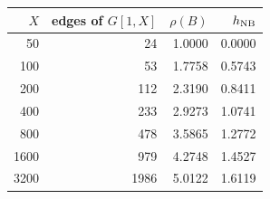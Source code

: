 \begin{tabular}{rrrr}\toprule $X$ & edges of $G[1,X]$ & $\rho(B)$ & $h_{\rm NB}$\\\midrule
50 & 24 & 1.0000 & 0.0000\\
100 & 53 & 1.7758 & 0.5743\\
200 & 112 & 2.3190 & 0.8411\\
400 & 233 & 2.9273 & 1.0741\\
800 & 478 & 3.5865 & 1.2772\\
1600 & 979 & 4.2748 & 1.4527\\
3200 & 1986 & 5.0122 & 1.6119\\
\bottomrule\end{tabular}
